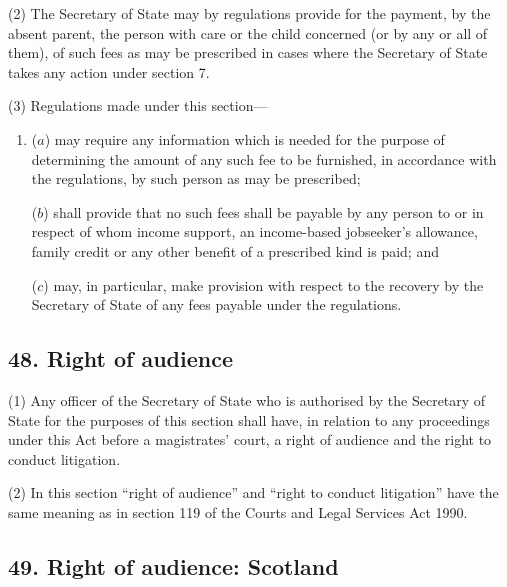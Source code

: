 \documentclass[12pt,a4paper]{article}
\begin{document}
(2) The Secretary of State may by regulations provide for the payment, by the absent parent, the person with care or the child concerned (or by any or all of them), of such fees as may be prescribed in cases where the Secretary of State takes any action under section 7.

(3) Regulations made under this section—
\begin{enumerate}\item[]
($a$) may require any information which is needed for the purpose of determining the amount of any such fee to be furnished, in accordance with the regulations, by such person as may be prescribed;

($b$) shall provide that no such fees shall be payable by any person to or in respect of whom income support, 
an income-based jobseeker’s allowance,  %
family credit or any other benefit of a prescribed kind is paid; and

($c$) may, in particular, make provision with respect to the recovery by the Secretary of State of any fees payable under the regulations.
\end{enumerate}


\subsection{48. Right of audience}

(1) Any 
officer of the Secretary of State who is authorised  %
by the Secretary of State for the purposes of this section shall have, in relation to any proceedings under this Act before a magistrates' court, a right of audience and the right to conduct litigation.

(2) In this section “right of audience” and “right to conduct litigation” have the same meaning as in section 119 of the Courts and Legal Services Act 1990.


\subsection{49. Right of audience: Scotland}
\end{document}
